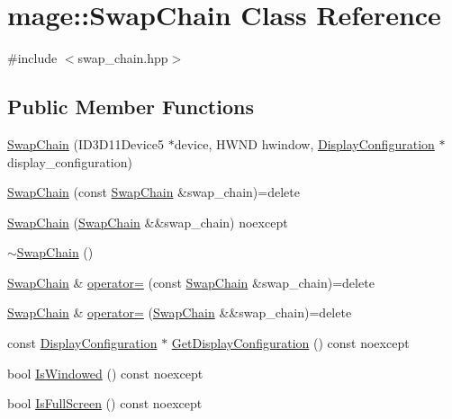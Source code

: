 \hypertarget{classmage_1_1_swap_chain}{}\section{mage\+:\+:Swap\+Chain Class Reference}
\label{classmage_1_1_swap_chain}


{\ttfamily \#include $<$swap\+\_\+chain.\+hpp$>$}

\subsection*{Public Member Functions}
\begin{DoxyCompactItemize}
\item 
\hyperlink{classmage_1_1_swap_chain_a2ba9364220d9f8fa03b5bd99318d32dc}{Swap\+Chain} (I\+D3\+D11\+Device5 $\ast$device, H\+W\+ND hwindow, \hyperlink{structmage_1_1_display_configuration}{Display\+Configuration} $\ast$display\+\_\+configuration)
\item 
\hyperlink{classmage_1_1_swap_chain_a85d5da233182a273705b4fa1c419a0aa}{Swap\+Chain} (const \hyperlink{classmage_1_1_swap_chain}{Swap\+Chain} \&swap\+\_\+chain)=delete
\item 
\hyperlink{classmage_1_1_swap_chain_ae1ca2e30957b83e89be5793ea6da76dd}{Swap\+Chain} (\hyperlink{classmage_1_1_swap_chain}{Swap\+Chain} \&\&swap\+\_\+chain) noexcept
\item 
\hyperlink{classmage_1_1_swap_chain_a853168cba69cadc3d8c10ad2f4939e72}{$\sim$\+Swap\+Chain} ()
\item 
\hyperlink{classmage_1_1_swap_chain}{Swap\+Chain} \& \hyperlink{classmage_1_1_swap_chain_a8ea6de219f37d447487d7d3b4bbd5867}{operator=} (const \hyperlink{classmage_1_1_swap_chain}{Swap\+Chain} \&swap\+\_\+chain)=delete
\item 
\hyperlink{classmage_1_1_swap_chain}{Swap\+Chain} \& \hyperlink{classmage_1_1_swap_chain_a4335d4e0869c43a66bfce5f2d0d6f34c}{operator=} (\hyperlink{classmage_1_1_swap_chain}{Swap\+Chain} \&\&swap\+\_\+chain)=delete
\item 
const \hyperlink{structmage_1_1_display_configuration}{Display\+Configuration} $\ast$ \hyperlink{classmage_1_1_swap_chain_afb7cf408081f09d0241f3e764a047e74}{Get\+Display\+Configuration} () const noexcept
\item 
bool \hyperlink{classmage_1_1_swap_chain_a7cf71ec46d0af888b9b1daa890a54d39}{Is\+Windowed} () const noexcept
\item 
bool \hyperlink{classmage_1_1_swap_chain_a85873ca586fbcd83c237692a011d6d08}{Is\+Full\+Screen} () const noexcept

\end{DoxyCompactItemize}
